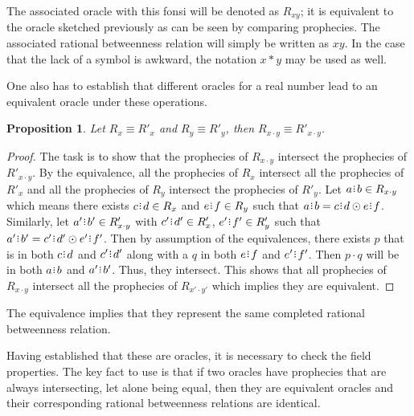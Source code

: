 \documentclass[12pt]{article}
\newtheorem{proposition}{Proposition}[section]
\begin{document}
The associated oracle with this fonsi will be denoted as $R_{xy}$; it is equivalent to the oracle sketched previously as can be seen by comparing prophecies. The associated rational betweenness relation will simply be written as $xy$. In the case that the lack of a symbol is awkward, the notation $x * y$ may be used as well. 

One also has to establish that different oracles for a real number lead to an equivalent oracle under these operations. 

\begin{proposition}
    Let $R_x \equiv R'_x$ and $R_y \equiv R'_y$, then $R_{x \cdot y} \equiv R'_{x \cdot y}$.
\end{proposition}

\begin{proof}
The task is to show that the prophecies of $R_{x \cdot y}$ intersect the prophecies of $R'_{x \cdot y}$. By the equivalence, all the prophecies of $R_x$ intersect all the prophecies of $R'_x$ and all the prophecies of $R_y$ intersect the prophecies of $R'_y$. Let $a\rint b \in R_{x \cdot y}$ which means there exists $c\rint d \in R_x$ and $e\rint f \in R_y$ such that $a\rint b = c\rint d \odot e\rint f$. Similarly, let $a'\rint b'\in R'_{x \cdot y}$ with $c'\rint d' \in R'_x$, $e'\rint f' \in R'_y$ such that $a'\rint b' = c'\rint d' \odot e'\rint f'$. Then by assumption of the equivalences, there exists $p$ that is in both $c\rint d$ and $c'\rint d'$ along with a $q$ in both $e\rint f$ and $e'\rint f'$. Then $p \cdot q$ will be in both $a\rint b$ and $a'\rint b'$. Thus, they intersect. This shows that all prophecies of $R_{x \cdot y}$ intersect all the prophecies of $R_{x' \cdot y'}$ which implies they are equivalent. 
\end{proof}

The equivalence implies that they represent the same completed rational betweenness relation.

Having established that these are oracles, it is necessary to check the field properties. The key fact to use is that if two oracles have prophecies that are always intersecting, let alone being equal, then they are equivalent oracles and their corresponding rational betweenness relations are identical. 
\end{document}
